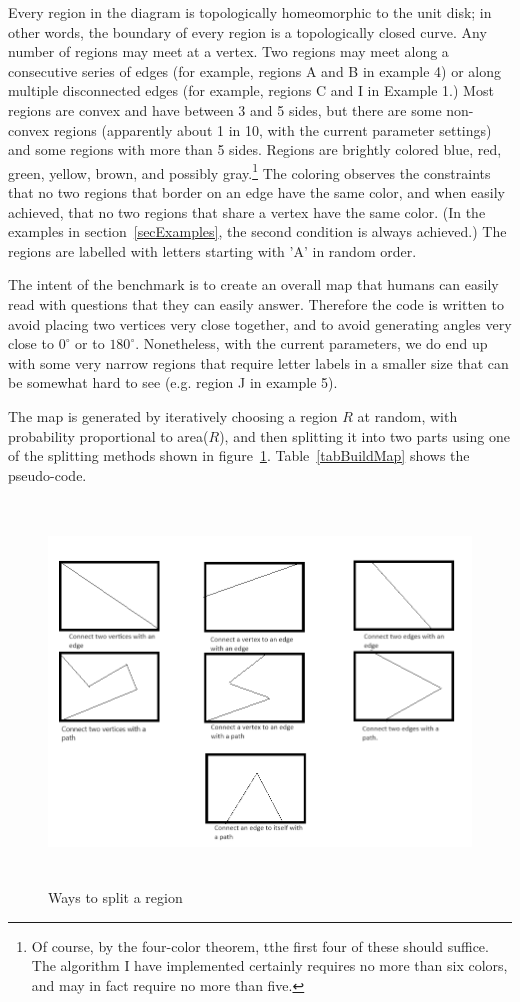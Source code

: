 \documentclass{article}    %
\begin{document}
Every region in the diagram is topologically homeomorphic to the unit disk; 
in other words, the boundary of every region is a topologically closed curve.
Any number of regions may meet at a vertex. Two regions may meet along a 
consecutive series of edges (for example, regions A and B in example 4)
or along multiple 
disconnected edges (for example, regions C and I in Example 1.) Most regions are
convex and have between 3 and 5 sides, but there are some non-convex regions 
(apparently about 1 in 10, with the current parameter settings) and some
regions with more than 5 sides. Regions are brightly colored blue, red, green,
yellow, brown, and possibly gray.\footnote{Of course, by the four-color theorem, tthe first four of these should suffice. The algorithm I have implemented 
certainly requires no more than six colors, and may in fact require no more
than five.} The 
coloring observes the constraints that no two regions that border on an
edge have the same color, and when easily achieved, that no two regions
that share a vertex have the same color. (In the examples in 
section~\ref{secExamples}, the second condition is always achieved.)
The regions are labelled with letters starting with 'A' in random order.

The intent of the benchmark is to create an overall map that humans can easily
read with questions that they can easily answer. Therefore the code is written
to avoid placing two vertices very close together, and to avoid generating 
angles very close to $0^{\circ}$ or to $180^{\circ}$. Nonetheless, with the
current parameters, we do end up with some very narrow regions that require 
letter labels in a smaller size that can be somewhat hard to see (e.g. region J
in example 5). 

The map is generated by iteratively choosing a region $R$ at random, with 
probability proportional to area($R$), and then 
splitting it into two parts using one of the splitting methods shown in 
figure~\ref{figSplits}. Table~\ref{tabBuildMap} shows the pseudo-code.

\begin{figure}
\includegraphics[height=4in]{FigSplits.png}
\caption{Ways to split a region}
\label{figSplits}
\end{figure}
\end{document}
